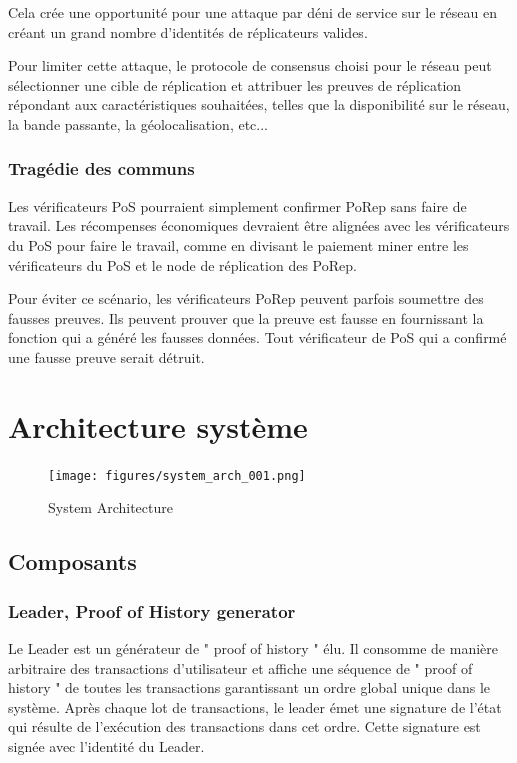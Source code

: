 \documentclass[12pt]{article}
\begin{document}
Cela crée une opportunité pour une attaque par déni de service sur le réseau en créant un grand nombre d'identités de réplicateurs valides.

Pour limiter cette attaque, le protocole de consensus choisi pour le réseau peut sélectionner une cible de réplication et attribuer les preuves de réplication répondant aux caractéristiques souhaitées, telles que la disponibilité sur le réseau, la bande passante, la géolocalisation,
etc...
\subsubsection{Tragédie des communs}

Les vérificateurs PoS pourraient simplement confirmer PoRep sans faire de travail. Les récompenses économiques devraient être alignées avec les vérificateurs du PoS pour faire le travail, comme en divisant le paiement miner entre les vérificateurs du PoS et le node de réplication des PoRep.

Pour éviter ce scénario, les vérificateurs PoRep peuvent parfois soumettre des fausses preuves. Ils peuvent prouver que la preuve est fausse en fournissant la fonction qui a généré les fausses données. Tout vérificateur de PoS qui a confirmé une fausse preuve serait détruit.

\section{Architecture système}\label{system_architecture}

\begin{figure}
  \begin{center}
    \centering
    \texttt{[image: figures/system\_arch\_001.png]}
    \caption[Fig 9]{System Architecture \label{fig_9}}
  \end{center}
  \end{figure}

\subsection{Composants}

\subsubsection{Leader, Proof of History generator}
Le Leader est un générateur de " proof of history " élu. Il consomme de manière arbitraire des transactions d’utilisateur et affiche une séquence de " proof of history " de toutes les transactions garantissant un ordre global unique dans le système. Après chaque lot de transactions, le leader émet une signature de l'état qui résulte de l'exécution des transactions dans cet ordre. Cette signature est signée avec l'identité du Leader.
\end{document}
